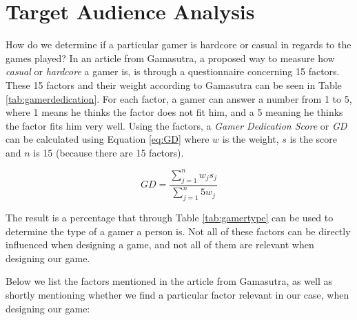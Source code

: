 \section{Target Audience Analysis} \label{sec:motivation}

How do we determine if a particular gamer is hardcore or casual in regards to the games played?
In an article from Gamasutra, a proposed way to measure how \textit{casual} or \textit{hardcore} a gamer is, is through a questionnaire concerning 15 factors\cite{casual_vs_hardcore}.
These 15 factors and their weight according to Gamasutra can be seen in Table \ref{tab:gamerdedication}\cite{casual_vs_hardcore}.
For each factor, a gamer can answer a number from 1 to 5, where 1 means he thinks the factor does not fit him, and a 5 meaning he thinks the factor fits him very well.
Using the factors, a \emph{Gamer Dedication Score} or \emph{GD} can be calculated using Equation \ref{eq:GD} where $w$ is the weight, $s$ is the score and $n$ is 15 (because there are 15 factors).

\begin{equation}\label{eq:GD}
GD = \frac{\sum\limits_{j=1}^n w_j s_j}{\sum\limits_{j=1}^n 5 w_j}
\end{equation}

The result is a percentage that through Table \ref{tab:gamertype} can be used to determine the type of a gamer a person is\cite{casual_vs_hardcore}.
Not all of these factors can be directly influenced when designing a game, and not all of them are relevant when designing our game.

Below we list the factors mentioned in the article from Gamasutra, as well as shortly mentioning whether we find a particular factor relevant in our case, when designing our game:


